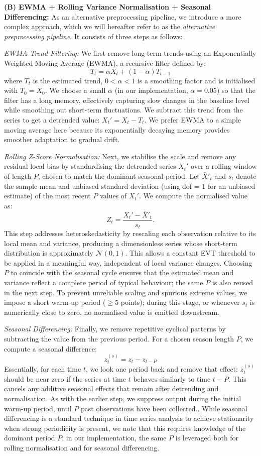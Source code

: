 \documentclass{statsmsc}
\begin{document}
\textbf{(B) EWMA + Rolling Variance Normalisation + Seasonal Differencing:} 
As an alternative preprocessing pipeline, we introduce a more complex approach,
which we will hereafter refer to as the \emph{alternative preprocessing pipeline}. 
It consists of three steps as follows:

\emph{EWMA Trend Filtering:} 
We first remove long-term trends using an Exponentially Weighted Moving Average (EWMA),
a recursive filter defined by: 
\[
T_t = \alpha X_t + (1-\alpha)T_{t-1}
\]
where $T_t$ is the estimated trend, $0<\alpha<1$ is a smoothing factor and is initialised with $T_0=X_0$. 
We choose a small \( \alpha \) (in our implementation, $\alpha = 0.05$) 
so that the filter has a long memory, effectively capturing slow changes in the baseline level 
while smoothing out short-term fluctuations. We subtract this trend from the series to get a 
detrended value: $X_t' = X_t - T_t$. We prefer EWMA to a simple moving average here 
because its exponentially decaying memory provides smoother adaptation to gradual drift.

\emph{Rolling Z-Score Normalisation:} 
Next, we stabilise the scale and remove any residual local bias by standardising the 
detrended series $X_t'$ over a rolling window of length $P$, chosen to match the 
dominant seasonal period. Let $\bar{X}'_t$ and $s_t$ denote the sample mean 
and unbiased standard deviation 
(using dof = $1$ for an unbiased estimate) of the most recent $P$ values of $X_t'$. 
We compute the normalised value as:
\[
Z_t = \frac{X_t' - \bar{X}'_t}{s_t}.
\]
This step addresses heteroskedasticity by rescaling each observation relative to 
its local mean and variance, producing a dimensionless series whose short-term 
distribution is approximately $\mathcal{N}(0,1)$. This allows a constant EVT 
threshold to be applied in a meaningful way, independent of local variance changes. 
Choosing $P$ to coincide with the seasonal cycle ensures that the estimated mean 
and variance reflect a complete period of typical behaviour; the same $P$ is also 
reused in the next step. To prevent unreliable scaling and spurious extreme values, 
we impose a short warm-up period ($\ge 5$ points); 
during this stage, or whenever $s_t$ is numerically close to zero, no normalised 
value is emitted downstream.

\emph{Seasonal Differencing:} Finally, we remove repetitive cyclical patterns by subtracting 
the value from the previous period. 
For a chosen season length $P$, 
we compute a seasonal difference: 
\[ 
z_t^{(s)} = z_t - z_{t-P}
\]
Essentially, for each time $t$, we look one period back and remove that 
effect: $z_t^{(s)}$ should be near zero if the series at time $t$ behaves similarly
to time $t-P$. This cancels any additive seasonal effects that 
remain after detrending and normalisation. As with the earlier step, 
we suppress output during the initial warm-up period, until \( P \) past observations have been collected.. 
While seasonal differencing is a standard technique in time series 
analysis to achieve stationarity when strong periodicity is present, 
we note that this requires knowledge of the dominant period $P$; 
in our implementation, the same $P$ is leveraged both for rolling normalisation 
and for seasonal differencing.
\end{document}
